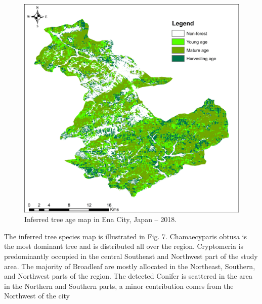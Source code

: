 \begin{figure}[tbh!]
    \centering
    \includegraphics[width=\textwidth]{figs/chap5/age_map.png}
    \caption[Inferred tree age map in Ena City]{Inferred tree age map in Ena City, Japan – 2018.}
    \label{fig:chap5_fig6}
\end{figure}
The inferred tree species map is illustrated in Fig. 7. Chamaecyparis obtusa is the most dominant tree and is distributed all over the region. Cryptomeria is predominantly occupied in the central Southeast and Northwest part of the study area. The majority of Broadleaf are mostly allocated in the Northeast, Southern, and Northwest parts of the region. The detected Conifer is scattered in the area in the Northern and Southern parts, a minor contribution comes from the Northwest of the city \par
